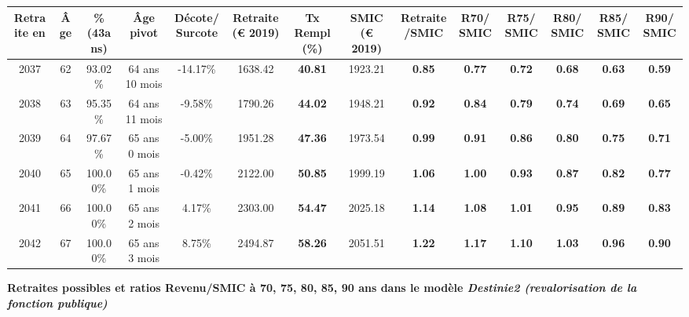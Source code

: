 \begin{adjustbox}{max width=\textwidth} 
\begin{tabular}[htb]{|c|c||c|c|c||c|c||c|c||c|c|c|c|c|} 
\hline 
 Retraite en &  Âge &  \%(43ans) &  Âge pivot &  Décote/Surcote &  Retraite (\euro{} 2019) &  Tx Rempl(\%) &  SMIC (\euro{} 2019) &  Retraite/SMIC &  R70/SMIC &  R75/SMIC &  R80/SMIC &  R85/SMIC &  R90/SMIC \\ 
\hline \hline 
 2037 &  62 &  93.02\% &  64 ans 10 mois &  -14.17\% &  1638.42 &  {\bf 40.81} &  1923.21 &  {\bf {\color{red} 0.85}} &  {\bf {\color{red} 0.77}} &  {\bf {\color{red} 0.72}} &  {\bf {\color{red} 0.68}} &  {\bf {\color{red} 0.63}} &  {\bf {\color{red} 0.59}} \\ 
\hline 
 2038 &  63 &  95.35\% &  64 ans 11 mois &  -9.58\% &  1790.26 &  {\bf 44.02} &  1948.21 &  {\bf {\color{red} 0.92}} &  {\bf {\color{red} 0.84}} &  {\bf {\color{red} 0.79}} &  {\bf {\color{red} 0.74}} &  {\bf {\color{red} 0.69}} &  {\bf {\color{red} 0.65}} \\ 
\hline 
 2039 &  64 &  97.67\% &  65 ans 0 mois &  -5.00\% &  1951.28 &  {\bf 47.36} &  1973.54 &  {\bf {\color{red} 0.99}} &  {\bf {\color{red} 0.91}} &  {\bf {\color{red} 0.86}} &  {\bf {\color{red} 0.80}} &  {\bf {\color{red} 0.75}} &  {\bf {\color{red} 0.71}} \\ 
\hline 
 2040 &  65 &  100.00\% &  65 ans 1 mois &  -0.42\% &  2122.00 &  {\bf 50.85} &  1999.19 &  {\bf 1.06} &  {\bf {\color{red} 1.00}} &  {\bf {\color{red} 0.93}} &  {\bf {\color{red} 0.87}} &  {\bf {\color{red} 0.82}} &  {\bf {\color{red} 0.77}} \\ 
\hline 
 2041 &  66 &  100.00\% &  65 ans 2 mois &  4.17\% &  2303.00 &  {\bf 54.47} &  2025.18 &  {\bf 1.14} &  {\bf 1.08} &  {\bf 1.01} &  {\bf {\color{red} 0.95}} &  {\bf {\color{red} 0.89}} &  {\bf {\color{red} 0.83}} \\ 
\hline 
 2042 &  67 &  100.00\% &  65 ans 3 mois &  8.75\% &  2494.87 &  {\bf 58.26} &  2051.51 &  {\bf 1.22} &  {\bf 1.17} &  {\bf 1.10} &  {\bf 1.03} &  {\bf {\color{red} 0.96}} &  {\bf {\color{red} 0.90}} \\ 
\hline 
\hline 
\end{tabular} 
\end{adjustbox} 
 
 \vspace{0.1cm} 
{\bf \noindent Retraites possibles et ratios Revenu/SMIC à 70, 75, 80, 85, 90 ans dans le modèle \emph{Destinie2 (revalorisation de la fonction publique)}}  
 

